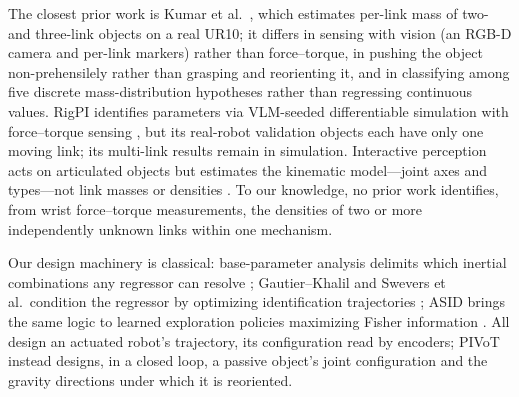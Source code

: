The closest prior work is Kumar et al.~\cite{kumar2019estimating}, which
estimates per-link mass of two- and three-link objects on a real UR10; it
differs in sensing with vision (an RGB-D camera and per-link
markers) rather than force--torque, in pushing the object non-prehensilely
rather than grasping and reorienting it, and in classifying among five discrete
mass-distribution hypotheses rather than regressing continuous values. RigPI
identifies parameters via VLM-seeded differentiable simulation with
force--torque sensing \cite{he2027rigpi}, but its real-robot validation
objects each have only one moving link; its multi-link results remain in
simulation. Interactive perception
acts on articulated objects but estimates the kinematic model---joint axes
and types---not link masses or densities
\cite{hausman2015active}. To our knowledge, no prior work
identifies, from wrist force--torque measurements, the densities of two or more
independently unknown links within one mechanism.

Our design machinery is classical: base-parameter analysis delimits
which inertial combinations any regressor can resolve
\cite{wensing2024geometric}; Gautier--Khalil
and Swevers et al.\ condition the regressor by optimizing
identification trajectories
\cite{gautier1992exciting,swevers1997optimal}; ASID brings the same logic to
learned exploration policies maximizing Fisher information
\cite{memmel2024asid}. All design an actuated robot's trajectory, its
configuration read by encoders; PIVoT instead designs, in a closed loop, a
passive object's joint configuration and the gravity directions under which
it is reoriented.

